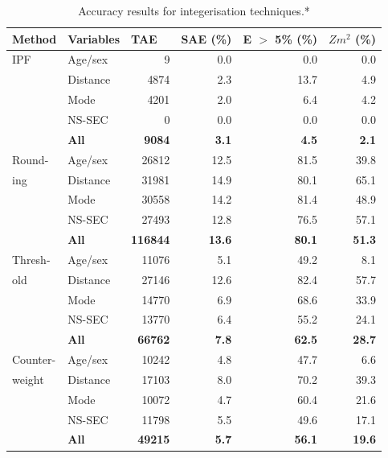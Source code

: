 \documentclass[a4paper, 11pt, twoside]{Thesis}
\begin{document}
\begin{table}[]
\caption{Accuracy results for integerisation techniques.*}
\small{
\begin{center}
\begin{tabular}{llrrrr}
\toprule
Method & Variables & \multicolumn{1}{l}{TAE} & \multicolumn{1}{l}{SAE (\%)} &
\multicolumn{1}{l}{E $>$ 5\% (\%)} & \multicolumn{1}{l}{$Z{m}^{2}$ (\%)} \\
\midrule
IPF & Age/sex & 9 & 0.0 & 0.0 & 0.0 \\
 & Distance & 4874 & 2.3 & 13.7 & 4.9 \\
 & Mode & 4201 & 2.0 & 6.4 & 4.2 \\
 & NS-SEC & 0 & 0.0 & 0.0 & 0.0 \\
\textbf{} & \textbf{All} & \textbf{9084} & \textbf{3.1} & \textbf{4.5} &
\textbf{2.1} \\
\midrule
Round- & Age/sex & 26812 & 12.5 & 81.5 & 39.8 \\
 ing& Distance & 31981 & 14.9 & 80.1 & 65.1 \\
 & Mode & 30558 & 14.2 & 81.4 & 48.9 \\
 & NS-SEC & 27493 & 12.8 & 76.5 & 57.1 \\
 & \textbf{All} & \textbf{116844} & \textbf{13.6} & \textbf{80.1} &
\textbf{51.3} \\
\midrule
Thresh- & Age/sex &  11076 & 5.1 & 49.2 & 8.1 \\
 old& Distance & 27146 & 12.6 & 82.4 & 57.7 \\
 & Mode & 14770 & 6.9 & 68.6 & 33.9 \\
 & NS-SEC & 13770 & 6.4 & 55.2 & 24.1 \\
 & \textbf{All} &  \textbf{66762} & \textbf{7.8} & \textbf{62.5} & \textbf{28.7}
\\
\midrule
Counter- & Age/sex & 10242 & 4.8 & 47.7 & 6.6 \\
weight& Distance &  17103 & 8.0 & 70.2 & 39.3 \\
 & Mode &  10072 & 4.7 & 60.4 & 21.6 \\
 & NS-SEC & 11798 & 5.5 & 49.6 & 17.1 \\
 & \textbf{All} & \textbf{49215} & \textbf{5.7} & \textbf{56.1} & \textbf{19.6}
\\
\midrule


\end{tabular}
\end{center}}
\end{table}
\end{document}
